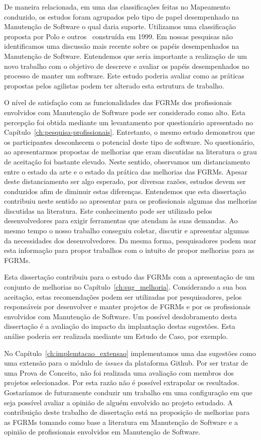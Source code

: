 De maneira relacionada, em uma das classificações feitas no Mapeamento
conduzido, os estudos foram agrupados pelo tipo de papel desempenhado na
Manutenção de Software o qual daria suporte. Utilizamos uma classificação
proposta por Polo e outros~\cite{Polo1999} construída em 1999. Em nossas
pesquisas não identificamos uma discussão mais recente sobre os papéis
desempenhados na Manutenção de Software. Entendemos que seria importante a
realização de um novo trabalho com o objetivo de descreve e avaliar os papéis
desempenhados no processo de manter um software. Este estudo poderia avaliar
como as práticas propostas pelos agilistas podem ter alterado esta estrutura de
trabalho.

O nível de satisfação com as funcionalidades das FGRMs dos profissionais
envolvidos com Manutenção de Software pode ser considerado como alto. Esta
percepção foi obtida mediante um levantamento por questionário apresentado no
Capítulo~\ref{ch:pesquisa-profissionais}. Entretanto, o mesmo estudo demonstrou
que os participantes desconhecem o potencial deste tipo de software. No
questionário, ao apresentarmos propostas de melhorias que eram discutidas na
literatura o grau de aceitação foi bastante elevado. Neste sentido, observamos
um distanciamento entre o estado da arte e o estado da prática das melhorias das
FGRMs. Apesar deste distanciamento ser algo esperado, por diversas razões,
estudos devem ser conduzidos afim de diminuir estas diferenças. Entendemos que
esta dissertação contribuiu neste sentido ao apresentar para os profissionais
algumas das melhorias discutidas na literatura. Este conhecimento pode ser
utilizado pelos desenvolvedores para exigir ferramentas que atendam às suas
demandas. Ao mesmo tempo o nosso trabalho conseguiu coletar, discutir e
apresentar algumas da necessidades dos desenvolvedores. Da mesma forma,
pesquisadores podem usar esta informação para propor trabalhos com o intuito de
propor melhorias para as FGRMs.

Esta dissertação contribuiu para o estudo das FGRMs com a apresentação de um
conjunto de melhorias no Capítulo~\ref{ch:sug_melhoria}. Considerando a sua boa
aceitação, estas recomendações podem ser utilizadas por pesquisadores, pelos
responsáveis por desenvolver e manter projetos de FGRMs e por os profissionais
envolvidos com Manutenção de Software. Um possível desdobramento desta
dissertação é a avaliação do impacto da implantação destas sugestões. Esta
análise poderia ser realizada mediante um Estudo de Caso, por exemplo.

No Capítulo~\ref{ch:implemtacao_extensao} implementamos uma das sugestões como
uma extensão para o módulo de \textit{issues} da plataforma Github. Por ser
tratar de uma Prova de Conceito, não foi realizada uma avaliação com membros dos
projetos selecionados. Por esta razão não é possível extrapolar os resultados.
Gostaríamos de futuramente conduzir um trabalho em uma configuração em que seja
possível avaliar a opinião de alguém envolvido no projeto estudado.  A
contribuição deste trabalho de dissertação está na proposição de melhorias para
as FGRMs tomando como base a literatura em Manutenção de Software e a opinião de
profissionais envolvidos em Manutenção de Software.

